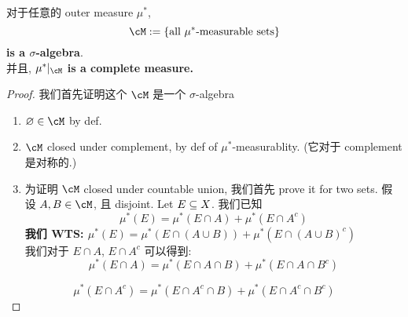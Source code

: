 \documentclass[lang=cn,11pt]{elegantbook}
\begin{document}
\begin{theorem}
\label{Carathéodory's Theorem}
对于任意的 outer measure $\mu^*$, 
\[
\cM := \{ \text{all } \mu^* \text{-measurable sets}    \}
\]\textbf{is a $\sigma$-algebra}.\\
并且, $\mu^* |_\cM$ \textbf{is a complete measure.}
\end{theorem}
\begin{proof}
我们首先证明这个 $\cM$ 是一个 $\sigma$-algebra
\begin{enumerate}
    \item  $\varnothing \in \cM$ by def.
    \item $\cM$ closed under complement, by def of $\mu^*$-measurablity. (它对于 complement 是对称的.)
    \item 为证明 $\cM$ closed under countable union, 我们首先 prove it for two sets.
    假设 $A, B \in \cM$, 且 disjoint. 
    Let $E \subseteq X$.
    我们已知 
    \begin{equation}
        \mu^*(E) = \mu^*(E \cap A) + \mu^*(E \cap A^c)
    \end{equation}
 \textbf{我们 WTS: $\mu^*(E) = \mu^*(E \cap (A\cup B)) + \mu^*(E \cap (A\cup B)^c)$}\\
\noindent 我们对于 $E \cap A$, $E\cap A^c$ 可以得到: \begin{equation}
    \mu^*(E \cap A) = \mu^*(E \cap A \cap B) + \mu^*(E \cap A \cap B^c)
\end{equation}
\end{enumerate}
\begin{equation}
    \mu^*(E \cap A^c) = \mu^*(E \cap A ^c\cap B) + \mu^*(E \cap A^c \cap B^c)
\end{equation}


\end{proof}
\end{document}
